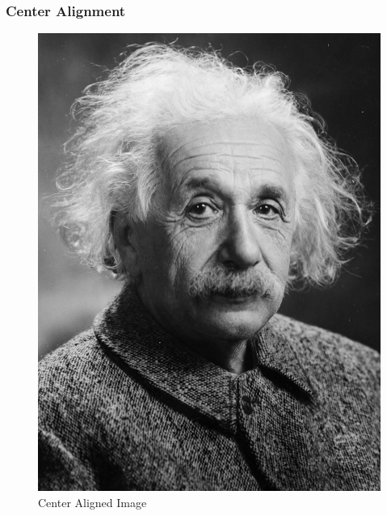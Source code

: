 \documentclass{article}
\begin{document}
\subsubsection{Center Alignment}
\begin{figure}[htbp]
    \centering
    \includegraphics{Images/Albert_Einstein.png}
    \caption{Center Aligned Image}
\end{figure}
\pagebreak
\end{document}
